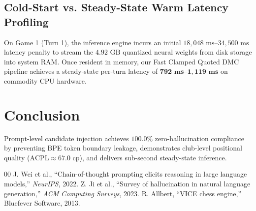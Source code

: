 \documentclass[conference]{IEEEtran}
\begin{document}
\subsection{Cold-Start vs. Steady-State Warm Latency Profiling}
On Game 1 (Turn 1), the inference engine incurs an initial $18,048\text{ ms} \text{--} 34,500\text{ ms}$ latency penalty to stream the $4.92\text{ GB}$ quantized neural weights from disk storage into system RAM. Once resident in memory, our Fast Clamped Quoted DMC pipeline achieves a steady-state per-turn latency of $\mathbf{792\text{ ms} \text{--} 1,119\text{ ms}}$ on commodity CPU hardware.

\section{Conclusion}
Prompt-level candidate injection achieves $100.0\%$ zero-hallucination compliance by preventing BPE token boundary leakage, demonstrates club-level positional quality ($\text{ACPL} \approx 67.0\text{ cp}$), and delivers sub-second steady-state inference.

\begin{thebibliography}{00}
 J. Wei et al., ``Chain-of-thought prompting elicits reasoning in large language models,'' \textit{NeurIPS}, 2022.
 Z. Ji et al., ``Survey of hallucination in natural language generation,'' \textit{ACM Computing Surveys}, 2023.
 R. Allbert, ``VICE chess engine,'' Bluefever Software, 2013.
\end{thebibliography}
\end{document}
